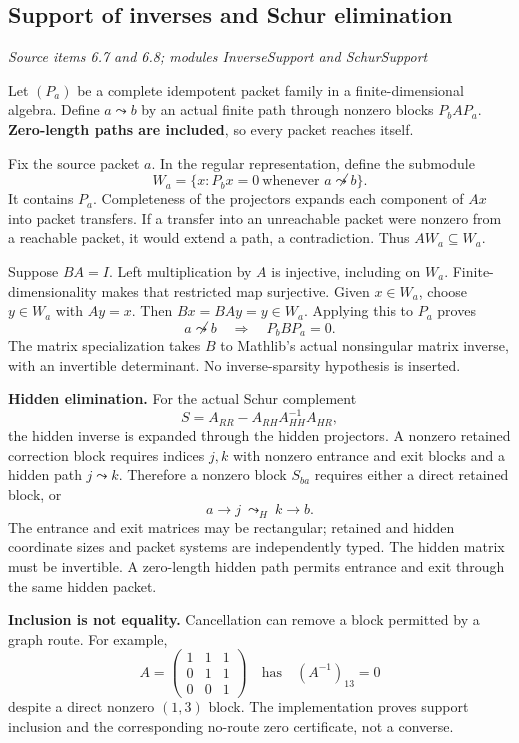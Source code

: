 \documentclass[11pt,letterpaper]{article}
\theoremstyle{definition}
\theoremstyle{remark}
\begin{document}
\subsection{Support of inverses and Schur elimination}\label{supp5:subsection:003}\textit{Source items 6.7 and 6.8; modules InverseSupport and SchurSupport}\par
Let $(P_a)$ be a complete idempotent packet family in a finite-dimensional algebra. Define $a\leadsto b$ by an actual finite path through nonzero blocks $P_bAP_a$. \textbf{Zero-length paths are included}, so every packet reaches itself.

Fix the source packet $a$. In the regular representation, define the submodule
\[
W_a=\{x:P_bx=0\ \text{whenever }a\not\leadsto b\}.
\]
It contains $P_a$. Completeness of the projectors expands each component of $Ax$ into packet transfers. If a transfer into an unreachable packet were nonzero from a reachable packet, it would extend a path, a contradiction. Thus $AW_a\subseteq W_a$.

Suppose $BA=I$. Left multiplication by $A$ is injective, including on $W_a$. Finite-dimensionality makes that restricted map surjective. Given $x\in W_a$, choose $y\in W_a$ with $Ay=x$. Then $Bx=BAy=y\in W_a$. Applying this to $P_a$ proves
\[
\boxed{a\not\leadsto b\quad\Longrightarrow\quad P_bBP_a=0.}
\]
The matrix specialization takes $B$ to Mathlib's actual nonsingular matrix inverse, with an invertible determinant. No inverse-sparsity hypothesis is inserted.

\textbf{Hidden elimination.} For the actual Schur complement
\[
S=A_{RR}-A_{RH}A_{HH}^{-1}A_{HR},
\]
the hidden inverse is expanded through the hidden projectors. A nonzero retained correction block requires indices $j,k$ with nonzero entrance and exit blocks and a hidden path $j\leadsto k$. Therefore a nonzero block $S_{ba}$ requires either a direct retained block, or
\[
a\longrightarrow j\ \leadsto_{H}\ k\longrightarrow b.
\]
The entrance and exit matrices may be rectangular; retained and hidden coordinate sizes and packet systems are independently typed. The hidden matrix must be invertible. A zero-length hidden path permits entrance and exit through the same hidden packet.

\textbf{Inclusion is not equality.} Cancellation can remove a block permitted by a graph route. For example,
\[
A=\begin{pmatrix}1&1&1\\0&1&1\\0&0&1\end{pmatrix}
\quad\text{has}\quad (A^{-1})_{13}=0
\]
despite a direct nonzero $(1,3)$ block. The implementation proves support inclusion and the corresponding no-route zero certificate, not a converse.
\end{document}
